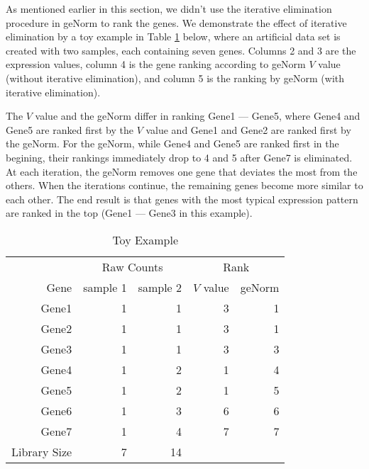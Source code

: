 \documentclass[11pt, a4paper]{article}
\begin{document}
As mentioned earlier in this section, we didn't use the iterative elimination procedure in geNorm to rank the genes. 
We demonstrate the effect of iterative elimination by a toy example in Table \ref{table:toyexample} below, where an artificial data set is created with two samples, each containing seven genes. Columns 2 and 3 are the expression values, column 4 is the gene ranking according to geNorm $V$ value (without iterative elimination), and column 5 is the ranking by geNorm (with iterative elimination). 
  
The $V$ value and the geNorm differ in ranking Gene1 --- Gene5, where Gene4 and Gene5 are ranked first by the $V$ value and Gene1 and Gene2 are ranked first by the geNorm. For the geNorm, while Gene4 and Gene5 are ranked first in the begining, their rankings immediately drop to 4 and 5 after Gene7 is eliminated. At each iteration, the geNorm removes one gene that deviates the most from the others. When the iterations continue, the remaining genes become more similar to each other. The end result is that genes with the most typical expression pattern are ranked in the top (Gene1 --- Gene3 in this example). 	  


\begin{table}[ht]
	\centering
	\begin{tabular}{rrrrr}
		\hline
		 & \multicolumn{2}{c}{Raw Counts} & \multicolumn{2}{c}{Rank}\\
	Gene	& sample 1 & sample 2 & $V$ value & geNorm \\ 
		\hline
		Gene1 & 1 & 1 & 3 & 1 \\ 
		Gene2 & 1 & 1 & 3 & 1 \\ 
		Gene3 & 1 & 1 & 3 & 3 \\ 
		Gene4 & 1 & 2 & 1 & 4 \\ 
		Gene5 & 1 & 2 & 1 & 5 \\ 
		Gene6 & 1 & 3 & 6 & 6 \\ 
		Gene7 & 1 & 4 & 7 & 7 \\ \hline 
	Library Size & 7 & 14 & & 	\\
		\hline
		\end{tabular}
		\caption{Toy Example} 
		\label{table:toyexample}
		\end{table}
\end{document}
